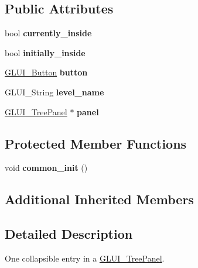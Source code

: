 \subsection*{Public Attributes}
\begin{DoxyCompactItemize}
\item 
\hypertarget{classGLUI__Tree_ab8c9cfc5885edf05eb1d516e61ebd7dc}{bool {\bfseries currently\-\_\-inside}}\label{classGLUI__Tree_ab8c9cfc5885edf05eb1d516e61ebd7dc}

\item 
\hypertarget{classGLUI__Tree_a920c5916bd08173bd22043e1f31b85d5}{bool {\bfseries initially\-\_\-inside}}\label{classGLUI__Tree_a920c5916bd08173bd22043e1f31b85d5}

\item 
\hypertarget{classGLUI__Tree_ab57f8d77aea6238adb73bc2572b030b8}{\hyperlink{classGLUI__Button}{G\-L\-U\-I\-\_\-\-Button} {\bfseries button}}\label{classGLUI__Tree_ab57f8d77aea6238adb73bc2572b030b8}

\item 
\hypertarget{classGLUI__Tree_a4047a0265f95953a1a029ec0f3dda5c3}{G\-L\-U\-I\-\_\-\-String {\bfseries level\-\_\-name}}\label{classGLUI__Tree_a4047a0265f95953a1a029ec0f3dda5c3}

\item 
\hypertarget{classGLUI__Tree_a4ba552062c7dfae187a9d346f8b42f08}{\hyperlink{classGLUI__TreePanel}{G\-L\-U\-I\-\_\-\-Tree\-Panel} $\ast$ {\bfseries panel}}\label{classGLUI__Tree_a4ba552062c7dfae187a9d346f8b42f08}

\end{DoxyCompactItemize}
\subsection*{Protected Member Functions}
\begin{DoxyCompactItemize}
\item 
\hypertarget{classGLUI__Tree_a7d2f013c76e7bd7a66336123f9741e77}{void {\bfseries common\-\_\-init} ()}\label{classGLUI__Tree_a7d2f013c76e7bd7a66336123f9741e77}

\end{DoxyCompactItemize}
\subsection*{Additional Inherited Members}


\subsection{Detailed Description}
One collapsible entry in a \hyperlink{classGLUI__TreePanel}{G\-L\-U\-I\-\_\-\-Tree\-Panel}. 

